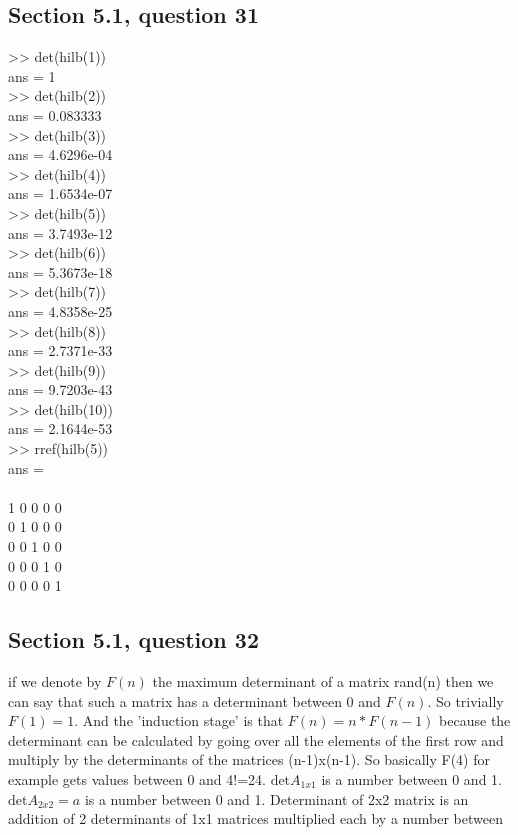 \documentclass[a4paper,11pt]{article}
\begin{document}
\subsection*{Section 5.1, question 31}
>> det(hilb(1))\\
ans = 1\\
>> det(hilb(2))\\
ans = 0.083333\\
>> det(hilb(3))\\
ans = 4.6296e-04\\
>> det(hilb(4))\\
ans = 1.6534e-07\\
>> det(hilb(5))\\
ans = 3.7493e-12\\
>> det(hilb(6))\\
ans = 5.3673e-18\\
>> det(hilb(7))\\
ans = 4.8358e-25\\
>> det(hilb(8))\\
ans = 2.7371e-33\\
>> det(hilb(9))\\
ans = 9.7203e-43\\
>> det(hilb(10))\\
ans = 2.1644e-53\\
>> rref(hilb(5))\\
ans =\\
\\
   1   0   0   0   0\\
   0   1   0   0   0\\
   0   0   1   0   0\\
   0   0   0   1   0\\
   0   0   0   0   1\\
\subsection*{Section 5.1, question 32}
if we denote by $F(n)$ the maximum determinant of a matrix rand(n) then we can say that such a matrix has a determinant between 0 and $F(n)$.
So trivially $F(1)=1$.
And the 'induction stage' is that $F(n)=n*F(n-1)$ because the determinant can be calculated by going over all the elements of the first row and multiply by the determinants of the matrices (n-1)x(n-1).
So basically F(4) for example gets values between 0 and 4!=24.
$\text{det}A_{1x1}$ is a number between 0 and 1.
$\text{det}A_{2x2}=a$ is a number between 0 and 1.
Determinant of 2x2 matrix is an addition of 2 determinants of 1x1 matrices multiplied each by a number between
\end{document}
